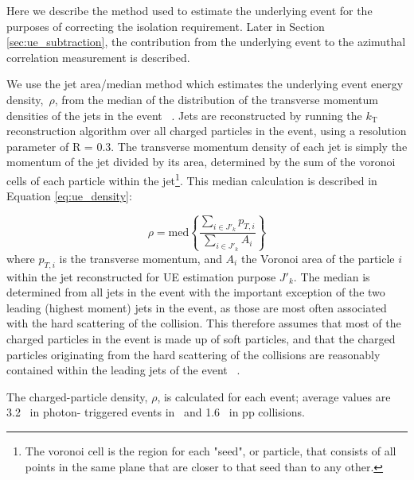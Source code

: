 Here we describe the method used to estimate the underlying event for the purposes of correcting the isolation requirement. Later in Section \ref{sec:ue_subtraction}, the contribution from the underlying event to the azimuthal correlation measurement is described.

We use the jet area/median method which estimates the underlying event energy density,~$\rho$, from the median of the distribution of the transverse momentum densities of the jets in the event ~\cite{Cacciari:2009dp}. Jets are reconstructed by running the $k_\mathrm{T}$ reconstruction algorithm over all charged particles in the event, using a resolution parameter of R = 0.3. The transverse momentum density of each jet is simply the momentum of the jet divided by its area, determined by the sum of the voronoi cells of each particle within the jet\footnote{The voronoi cell is the region for each "seed", or particle, that  consists of all points in the same  plane that are closer to that seed than to any other.}. 
 This median calculation is described in Equation \ref{eq:ue_density}:

\begin{equation}
\label{eq:ue_density}
  \rho = \mathrm{med} \left\{ \frac{\sum_{i\in J'_k}
    p_{T,i}}{\sum_{i\in J'_k} A_i} \right\}
\end{equation}
where $p_{T,i}$ is the transverse momentum, and $A_i$ the Voronoi area of the particle $i$ within the jet reconstructed for UE estimation purpose $J'_k$. The median is determined from all jets in the event with the important exception of the two leading (highest moment) jets in the event, as those are most often associated with the hard scattering of the collision. This therefore assumes that most of the charged particles in the event is made up of soft particles, and that the charged particles originating from the hard scattering of the collisions are reasonably contained within the leading jets of the event ~\cite{Cacciari:2009dp}.

The charged-particle density, $\rho$, is calculated for each event; average values are 3.2 \GeVc~in photon- triggered events in \pPb~and 1.6 \GeVc~in pp collisions.




